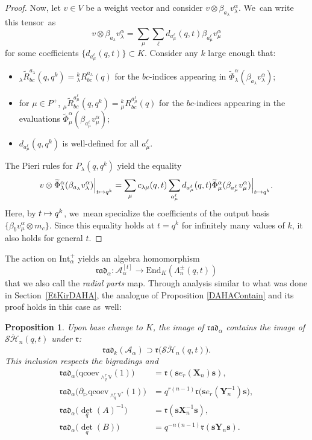 \documentclass[JEP,XML,SOM,Unicode,published]{cedram}
\newcommand\mto{\mathchoice{\longmapsto}{\mapsto}{\mapsto}{\mapsto}}
\newtheorem{prop}[thm]{Proposition}
\theoremstyle{definition}
\newcommand{\AAA}{\mathcal{A}}
\newcommand{\SHH}{\mathcal{S}\ddot{\mathcal{H}}}
\newcommand{\ee}{\boldsymbol{s}}
\newcommand{\rrr}{\mathfrak{r}}
\begin{document}
\begin{proof}
Now, let $v\in V$ be a weight vector and consider $v\otimes\beta_{a_\lambda}v_\lambda^\alpha$. We~can write this tensor~as
\[
v\otimes\beta_{a_\lambda}v_\lambda^\alpha = \sum_{\mu}\sum_{\ell}d_{a_\mu^\ell}(q,t)\beta_{a_\mu^\ell}v_\mu^\alpha
\]
for some coefficients $\{d_{a_\mu^\ell}(q,t)\}\subset K$.
Consider any $k$ large enough that:
\begin{itemize}
\item ${}_\lambda\widetilde{R}_{bc}^{a_\lambda}(q,q^k)= {}_\lambda^kR_{bc}^{a_\lambda}(q)$ for the $bc$-indices appearing in $\widetilde{\Phi}_\lambda^\alpha(\beta_{a_\lambda}v_\lambda^\alpha)$;
\item for $\mu\in P^+$, ${}_\mu\widetilde{R}_{bc}^{a_\mu^\ell}(q,q^k)= {}_\mu^k R_{bc}^{a_\mu^\ell}(q)$ for the $bc$-indices appearing in the evaluations $\widetilde{\Phi}_\mu^\alpha(\beta_{a_\mu^\ell}v_\mu^\alpha)$;
\item $d_{a_\mu^\ell}(q,q^k)$ is well-defined for all $a_\mu^\ell$.
\end{itemize}
The Pieri rules for $P_\lambda(q,q^k)$ yield the equality
\[
v\otimes\widetilde{\Phi}_\lambda^\alpha(\beta_{a_\lambda}v_\lambda^\alpha)\Big|_{t\mto q^k}
=
\sum_{\mu} c_{\lambda\mu}(q,t)\sum_{a_\mu^\ell}d_{a_\mu^\ell}(q,t)\widetilde{\Phi}_\mu^\alpha(\beta_{a_\mu^\ell}v_\mu^\alpha)\Big|_{t\mto q^k}.
\]
Here, by $t\mto q^k$, we~mean specialize the coefficients of the output basis $\{\beta_b v_\mu^\alpha\otimes m_c\}$.
Since this equality holds at $t=q^k$ for infinitely many values of $k$, it also holds for general $t$.
\end{proof}

The action on $\mathrm{Int}_\alpha^+$ yields an algebra homomorphism
\[
\mathfrak{rad}_\alpha:\AAA^{[t]}_\alpha\to\mathrm{End}_K(\Lambda^\pm_n(q,t))
\]
that we also call the \textit{radial parts} map.
Through analysis similar to what was done in Section~\ref{EtKirDAHA}, the analogue of Proposition \ref{DAHAContain} and its proof holds in this case as~well:
\begin{prop}\label{tDAHAContain}
Upon base change to $K$, the image of $\mathfrak{rad}_\alpha$ contains the image of $\SHH_n(q,t)$ under $\rrr$:
\[
\mathfrak{rad}_k\left(\AAA_\alpha \right)\supset\rrr\bigl(\SHH_n(q,t) \bigr).
\]
This inclusion respects the bigradings and
\begin{equation*}
\begin{aligned}
\mathfrak{rad}_\alpha\bigl(\mathrm{qcoev}_{\wedge_q^r\mathbb{V}}(1) \bigr)&= \rrr(\ee e_r(\boldsymbol{X}_n)\ee),\\
\mathfrak{rad}_\alpha\bigl(\partial_\triangleright\mathrm{qcoev}_{\wedge_q^r\mathbb{V}^*}(1) \bigr)&= q^{r(n-1)}\rrr\bigl(\ee e_r(\boldsymbol{Y}^{-1}_n)\ee \bigr),\\
\mathfrak{rad}_\alpha\bigl(\textstyle\det_q(A)^{-1}\bigr)&= \rrr(\ee \boldsymbol{X}^{-1}_n\ee),\\
\mathfrak{rad}_\alpha\bigl(\textstyle\det_q(B)\bigr)&= q^{-n(n-1)}\rrr(\ee \boldsymbol{Y}_n\ee).
\end{aligned}
\end{equation*}
\end{prop}
\end{document}
